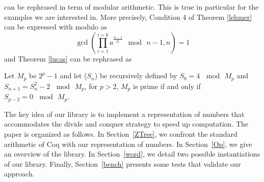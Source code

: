 can be rephrased in term of modular arithmetic. This is true in particular for the examples we are
interested in. More precisely, Condition 4 of Theorem \ref{lehmer} can be expressed with modulo as
$$
\gcd(\prod_{i=1}^{i=k}a^{\frac{n-1}{p_i}} \mod\, n -1,n) = 1
$$
and Theorem \ref{lucas} can be rephrased as
\begin{theorem}
Let $M_p$ be $2^p-1$ and let  ($S_n$) be recursively defined by $S_0= 4\, \mod\, M_p$ and $S_{n+1} = S_n^2 - 2\, \mod\, M_p$,
for $p > 2$, $M_p$ is prime if and only if $S_{p-2} = 0\, \mod\, M_p $.
\end{theorem}
The key idea of our library is to implement a representation of numbers that accommodates the divide and
conquer strategy to speed up computation. The paper is organized as follows. 
In Section~\ref{ZTree}, we confront the standard arithmetic of {\sc Coq} with
our representation of numbers. In Section~\ref{Op}, we give an overview of the library.  
In Section~\ref{word}, we detail two possible instantiations of our library.
Finally, Section~\ref{bench} presents some tests that validate our approach.
 
